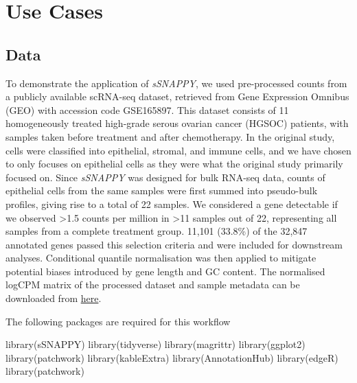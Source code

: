 \documentclass[9pt,a4paper,]{extarticle}
\newenvironment{Shaded}{\begin{snugshade}}{\end{snugshade}}
\newcommand{\FunctionTok}[1]{\textcolor[rgb]{0.00,0.00,0.00}{#1}}
\newcommand{\NormalTok}[1]{#1}
\begin{document}
\hypertarget{use-cases}{%
\section{Use Cases}\label{use-cases}}

\hypertarget{data}{%
\subsection{Data}\label{data}}

To demonstrate the application of \emph{sSNAPPY}, we used pre-processed counts from a publicly available scRNA-seq dataset, retrieved from Gene Expression Omnibus (GEO) with accession code GSE165897.
This dataset consists of 11 homogeneously treated high-grade serous ovarian cancer (HGSOC) patients, with samples taken before treatment and after chemotherapy\citep{Zhang2022}.
In the original study, cells were classified into epithelial, stromal, and immune cells, and we have chosen to only focuses on epithelial cells as they were what the original study primarily focused on.
Since \emph{sSNAPPY} was designed for bulk RNA-seq data, counts of epithelial cells from the same samples were first summed into pseudo-bulk profiles, giving rise to a total of 22 samples.
We considered a gene detectable if we observed \textgreater1.5 counts per million in \textgreater11 samples out of 22, representing all samples from a complete treatment group.
11,101 (33.8\%) of the 32,847 annotated genes passed this selection criteria and were included for downstream analyses.
Conditional quantile normalisation\citep{Hansen2012} was then applied to mitigate potential biases introduced by gene length and GC content.
The normalised logCPM matrix of the processed dataset and sample metadata can be downloaded from \href{https://github.com/Wenjun-Liu/F1000_sSNAPPY_manuscript/tree/master/data}{here}.

The following packages are required for this workflow

\begin{Shaded}
\begin{Highlighting}[]
\FunctionTok{library}\NormalTok{(sSNAPPY)}
\FunctionTok{library}\NormalTok{(tidyverse)}
\FunctionTok{library}\NormalTok{(magrittr)}
\FunctionTok{library}\NormalTok{(ggplot2)}
\FunctionTok{library}\NormalTok{(patchwork)}
\FunctionTok{library}\NormalTok{(kableExtra)}
\FunctionTok{library}\NormalTok{(AnnotationHub) }
\FunctionTok{library}\NormalTok{(edgeR)}
\FunctionTok{library}\NormalTok{(patchwork)}
\end{Highlighting}
\end{Shaded}
\end{document}
